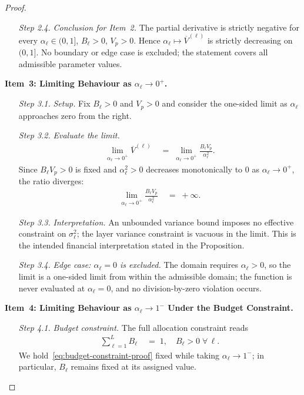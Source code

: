 \documentclass[12pt,openany]{book}
\numberwithin{equation}{chapter}
\theoremstyle{plain}
\theoremstyle{definition}
\theoremstyle{remark}
\begin{document}
\begin{proof}
\begin{enumerate}
  \item[\textit{Step 2.4.}] \emph{Conclusion for Item~2.}
        The partial derivative is strictly negative for every
        $\alpha_\ell \in (0,1]$, $B_\ell > 0$, $V_p > 0$.
        Hence $\alpha_\ell \mapsto \overline{V}^{(\ell)}$ is
        strictly decreasing on $(0,1]$.  No boundary or edge
        case is excluded; the statement covers all admissible
        parameter values.
\end{enumerate}

\noindent\textbf{Item~3: Limiting Behaviour as
$\alpha_\ell \to 0^+$.}
\begin{enumerate}
  \item[\textit{Step 3.1.}] \emph{Setup.}
        Fix $B_\ell > 0$ and $V_p > 0$ and consider the
        one-sided limit as $\alpha_\ell$ approaches zero from
        the right.

  \item[\textit{Step 3.2.}] \emph{Evaluate the limit.}
        \begin{align}
          \lim_{\alpha_\ell \to 0^+}
          \overline{V}^{(\ell)}
          &\;=\;
          \lim_{\alpha_\ell \to 0^+}
          \frac{B_\ell V_p}{\alpha_\ell^2}.
        \end{align}
        Since $B_\ell V_p > 0$ is fixed and $\alpha_\ell^2 > 0$
        decreases monotonically to $0$ as $\alpha_\ell \to 0^+$,
        the ratio diverges:
        \begin{align}
          \lim_{\alpha_\ell \to 0^+}
          \frac{B_\ell V_p}{\alpha_\ell^2}
          &\;=\; +\infty.
        \end{align}

  \item[\textit{Step 3.3.}] \emph{Interpretation.}
        An unbounded variance bound imposes no effective
        constraint on $\sigma^2_\ell$; the layer variance
        constraint is vacuous in the limit.  This is the
        intended financial interpretation stated in the
        Proposition.

  \item[\textit{Step 3.4.}] \emph{Edge case: $\alpha_\ell = 0$
        is excluded.}
        The domain requires $\alpha_\ell > 0$, so the
        limit is a one-sided limit from within the admissible
        domain; the function is never evaluated at
        $\alpha_\ell = 0$, and no division-by-zero violation
        occurs.
\end{enumerate}

\noindent\textbf{Item~4: Limiting Behaviour as
$\alpha_\ell \to 1^-$ Under the Budget Constraint.}
\begin{enumerate}
  \item[\textit{Step 4.1.}] \emph{Budget constraint.}
        The full allocation constraint reads
        \begin{align}
          \sum_{\ell=1}^{L} B_\ell &\;=\; 1,
          \quad B_\ell > 0 \;\forall\, \ell.
          \label{eq:budget-constraint-proof}
        \end{align}
        We hold~\eqref{eq:budget-constraint-proof} fixed while
        taking $\alpha_\ell \to 1^-$; in particular, $B_\ell$
        remains fixed at its assigned value.


\end{enumerate}
\end{proof}
\end{document}

